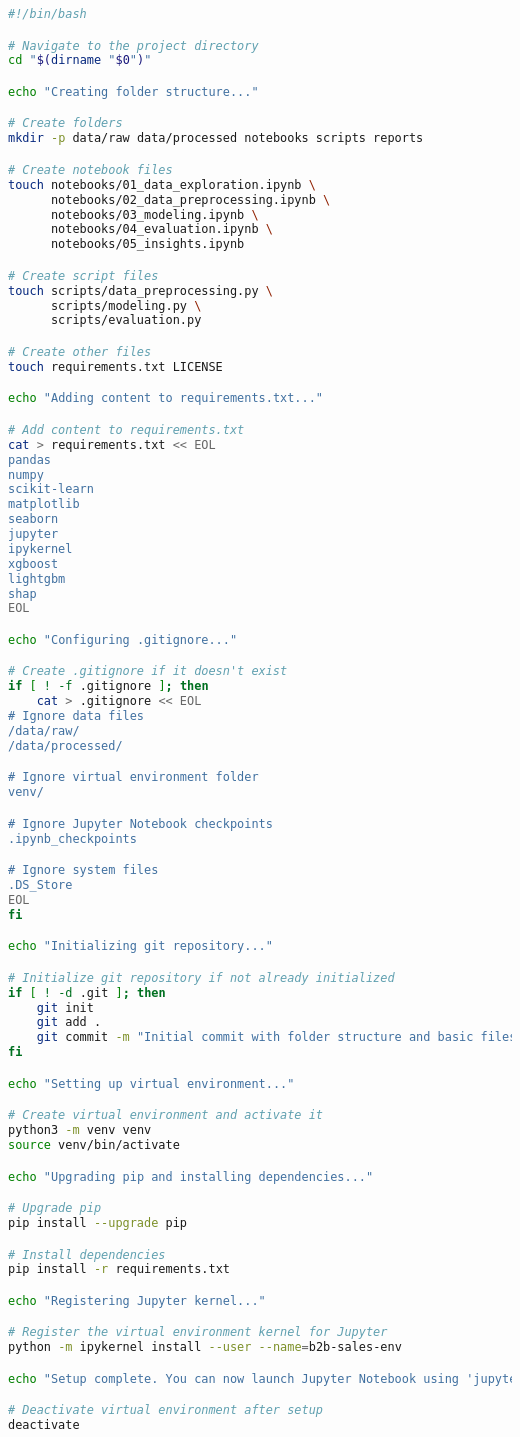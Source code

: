 \documentclass{article}
\begin{document}
\begin{lstlisting}[language=bash,caption={setup.sh},label=setupsh]
#!/bin/bash

# Navigate to the project directory
cd "$(dirname "$0")"

echo "Creating folder structure..."

# Create folders
mkdir -p data/raw data/processed notebooks scripts reports

# Create notebook files
touch notebooks/01_data_exploration.ipynb \
      notebooks/02_data_preprocessing.ipynb \
      notebooks/03_modeling.ipynb \
      notebooks/04_evaluation.ipynb \
      notebooks/05_insights.ipynb

# Create script files
touch scripts/data_preprocessing.py \
      scripts/modeling.py \
      scripts/evaluation.py

# Create other files
touch requirements.txt LICENSE

echo "Adding content to requirements.txt..."

# Add content to requirements.txt
cat > requirements.txt << EOL
pandas
numpy
scikit-learn
matplotlib
seaborn
jupyter
ipykernel
xgboost
lightgbm
shap
EOL

echo "Configuring .gitignore..."

# Create .gitignore if it doesn't exist
if [ ! -f .gitignore ]; then
    cat > .gitignore << EOL
# Ignore data files
/data/raw/
/data/processed/

# Ignore virtual environment folder
venv/

# Ignore Jupyter Notebook checkpoints
.ipynb_checkpoints

# Ignore system files
.DS_Store
EOL
fi

echo "Initializing git repository..."

# Initialize git repository if not already initialized
if [ ! -d .git ]; then
    git init
    git add .
    git commit -m "Initial commit with folder structure and basic files"
fi

echo "Setting up virtual environment..."

# Create virtual environment and activate it
python3 -m venv venv
source venv/bin/activate

echo "Upgrading pip and installing dependencies..."

# Upgrade pip
pip install --upgrade pip

# Install dependencies
pip install -r requirements.txt

echo "Registering Jupyter kernel..."

# Register the virtual environment kernel for Jupyter
python -m ipykernel install --user --name=b2b-sales-env

echo "Setup complete. You can now launch Jupyter Notebook using 'jupyter notebook'"

# Deactivate virtual environment after setup
deactivate
\end{lstlisting}
\end{document}
